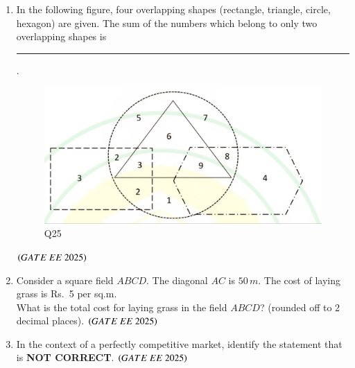 \documentclass[journal,12pt,onecolumn]{IEEEtran}
\theoremstyle{remark}
\begin{document}
\begin{enumerate}
\item In the following figure, four overlapping shapes (rectangle, triangle, circle, hexagon) are given. The sum of the numbers which belong to only two overlapping shapes is \rule{2cm}{0.4pt}. \\
\begin{figure}[H]
\centering
\caption{Q25}
\label{Q25}
\includegraphics[scale=0.25]{figs/Q25.jpg}
\end{figure}
\hfill $\left(GATE\ EE\ 2025\right)$

\item Consider a square field $ABCD$. The diagonal $AC$ is $50\,m$. The cost of laying grass is Rs.\ 5 per sq.m. \\
What is the total cost for laying grass in the field $ABCD$? (rounded off to 2 decimal places).
\hfill $\left(GATE\ EE\ 2025\right)$

\item In the context of a perfectly competitive market, identify the statement that is \textbf{NOT CORRECT}.
\hfill $\left(GATE\ EE\ 2025\right)$
\begin{enumerate}
\end{enumerate}


\end{enumerate}
\end{document}
